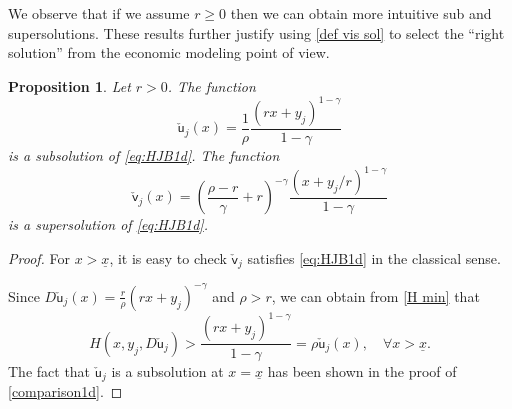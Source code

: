 \documentclass[11pt]{article}
\numberwithin{equation}{section}
\newtheorem{proposition}[theorem]{Proposition}
\theoremstyle{Claim}
\def\su{{\mathsf{u}}}
\def\sv{{\mathsf{v}}}
\newcommand{\ux}{{\underline x}}
\newcommand{\beq}{\begin{equation}}
\newcommand{\eeq}{\end{equation}}
\theoremstyle{plain}
\begin{document}
We observe that if we assume $r\geq 0$ then we can obtain more intuitive sub and supersolutions. These results further justify using \cref{def vis sol} to select the ``right solution'' from the economic modeling point of view. 
\begin{proposition}\label{comparison1d r}
Let $r> 0$. The function
\begin{equation}\label{sub sol}
	\check{\su}_j(x) = \frac{1}{\rho} \frac{(rx + y_j)^{1 - \gamma}}{1 - \gamma}
\end{equation}
is a subsolution  of \eqref{eq:HJB1d}. The function 
\begin{equation}\label{super sol}
	\check{\sv}_j(x) =\left( \frac{\rho - r}{\gamma} + r \right)^{-\gamma} \frac{(x + y_j/r)^{1 - \gamma}}{1 - \gamma}
\end{equation}
is  a supersolution  of \eqref{eq:HJB1d}.
\end{proposition}
\begin{proof}
For $x>\ux$, it is easy to check $\check{\sv}_j$ satisfies \cref{eq:HJB1d} in the classical sense.\par
Since $D\check{\su}_j(x)=\frac{r}{\rho} (rx + y_j)^{-\gamma}$ and $\rho>r$, we can obtain from \cref{H min} that 
$$
H(x,y_j,D\check{\su}_j)>\frac{(rx + y_j )^{1 - \gamma}}{1 - \gamma}=\rho \check{\su}_j(x),\quad \forall x>\ux.
$$
The fact that $\check{\su}_j$ is a subsolution at $x=\ux$ has been shown in the proof of \cref{comparison1d}. 
\end{proof}
\end{document}
